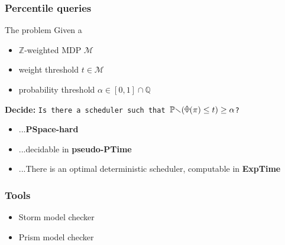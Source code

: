 \documentclass[onlymath]{beamer}
\begin{document}
\begin{frame}
	\frametitle{Percentile queries}
	\begin{block}{The problem}
		Given a
		\begin{itemize}
			\item $\mathbb{Z}$-weighted MDP $\mathcal{M}$ \pause
			\item weight threshold $t \in \mathcal{M}$ \pause
			\item probability threshold $\alpha \in [0,1] \cap \mathbb{Q}$ \pause
		\end{itemize}
		\textbf{Decide:} \texttt{Is there a scheduler such that $\mathbb{Pr}(\rawdiaplus(\pi) \leq t) \geq \alpha$?}\pause
		\begin{itemize}
			\item ...\textbf{PSpace-hard} \pause
			\item ...decidable in \textbf{pseudo-PTime}\pause
			\item ...There is an optimal deterministic scheduler, computable in \textbf{ExpTime}
		\end{itemize}
	\end{block}
\end{frame}

\begin{frame}
	\frametitle{Tools}
	\begin{itemize}
		\item Storm model checker
		\item Prism model checker
	\end{itemize}
\end{frame}

\end{document}
